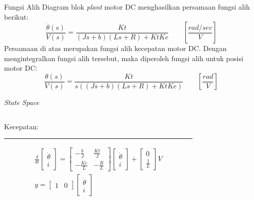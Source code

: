 \documentclass[10pt,xcolor={dvipsnames}]{beamer}
\begin{document}
\begin{frame}{Fungsi Alih}
	Diagram blok \textit{plant} motor DC menghasilkan persamaan fungsi alih berikut:
	\begin{equation}
		\frac{\dot{\theta}(s)}{V(s)}=\frac{Kt}{(Js+b)(Ls+R)+KtKe} \qquad \left[\frac{rad/sec}{V}\right] 
	\end{equation} 
	Persamaan di atas merupakan fungsi alih kecepatan motor DC. Dengan mengintegralkan fungsi alih tersebut, maka diperoleh fungsi alih untuk posisi motor DC:
	\begin{equation}
		\frac{\theta(s)}{V(s)}=\frac{Kt}{s((Js+b)(Ls+R)+KtKe)} \qquad \left[\frac{rad}{V}\right]
		\label{position}
	\end{equation}
\end{frame}

\begin{frame}{\textit{State Space}}
	\begin{columns}[T]
		\begin{column}{0.5\textwidth}
			Kecepatan:
			\color{black}\rule{\linewidth}{4pt}
			\begin{equation}
				\begin{split}
					\frac{\delta}{\delta t}
					\begin{bmatrix}
						\dot{\theta} \\ i
					\end{bmatrix}
					=
					\begin{bmatrix}
						-\frac{b}{J} & \frac{Kt}{J}\\
						-\frac{Ke}{L} & -\frac{R}{L}
					\end{bmatrix}
					\begin{bmatrix}
						\dot{\theta} \\ i
					\end{bmatrix}
					+
					\begin{bmatrix}
						0 \\ \frac{1}{L}
					\end{bmatrix}
					V\\
					y=
					\begin{bmatrix}
						1 & 0
					\end{bmatrix}
						\begin{bmatrix}
						\dot{\theta} \\ i
					\end{bmatrix}
				\end{split}
			\end{equation}
		\end{column}%
		\hfill%
		\begin{column}{0.5\textwidth}

\end{column}
\end{columns}
\end{frame}
\end{document}
